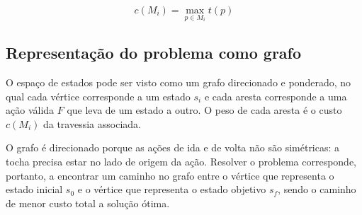 \begin{equation}
	c(M_i) = \max_{p \in M_i} t(p)
\end{equation}

\subsection{Representação do problema como grafo}

O espaço de estados pode ser visto como um grafo direcionado e ponderado, no
qual cada vértice corresponde a um estado $s_i$ e cada aresta
corresponde a uma ação válida $F$ que leva de um estado a
outro. O peso de cada aresta é o custo $c(M_i)$ da travessia associada.

O grafo é direcionado porque as ações de ida e de volta não são simétricas:
a tocha precisa estar no lado de origem da ação. Resolver o problema
corresponde, portanto, a encontrar um caminho no grafo entre o vértice que
representa o estado inicial $s_0$ e o vértice que representa o estado
objetivo $s_f$, sendo o caminho de menor custo total a solução ótima.
